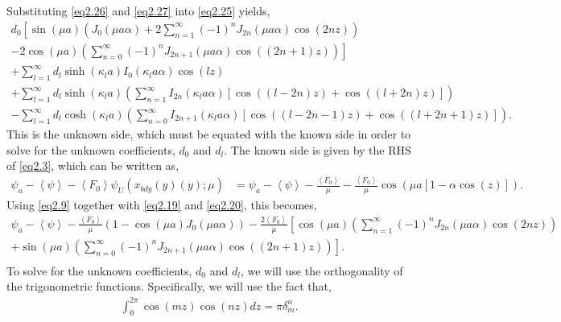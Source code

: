 \documentclass[aip,graphicx]{revtex4-1}
\newcommand{\lr}[1]{\left(#1\right)}
\newcommand{\lrsq}[1]{\left[ #1 \right]}
\newcommand{\lra}[1]{\left\langle #1 \right\rangle}
\newcommand{\xbdy}{x_{bdy}(y)}
\newcommand{\besj}[2]{J_{#1}\lr{#2}}
\newcommand{\besi}[2]{I_{#1}\lr{#2}}
\begin{document}
Substituting \eqref{eq2.26} and \eqref{eq2.27} into \eqref{eq2.25} yields,
         \begin{multline}
        d_0\left[\sin\lr{\mu a}\lr{\besj{0}{\mu a \alpha}+2\sum_{n=1}^{\infty}\lr{-1}^n\besj{2n}{\mu a \alpha}\cos\lr{2nz}}\right.\\
        \left.-2\cos\lr{\mu a}\lr{\sum_{n=0}^{\infty}\lr{-1}^n\besj{2n+1}{\mu a \alpha}\cos\lr{\lr{2n+1}z}}\right]\\
        +\sum_{l=1}^{\infty}d_l\sinh\lr{\kappa_l a}\besi{0}{\kappa_l a \alpha}\cos\lr{lz}\\
        +\sum_{l=1}^{\infty}d_l\sinh\lr{\kappa_l a}\lr{  
        \sum_{n=1}^{\infty}\besi{2n}{\kappa_l a \alpha}\lrsq{\cos\lr{\lr{l-2n}z}+\cos\lr{\lr{l+2n}z}}}\\
        -\sum_{l=1}^{\infty}d_l\cosh\lr{\kappa_l a}\lr{\sum_{n=0}^{\infty}\besi{2n+1}{\kappa_l a \alpha}\lrsq{\cos\lr{\lr{l-2n-1}z}+\cos\lr{\lr{l+2n+1}z}}}.\label{eq2.28}
        \end{multline}
This is the unknown side, which must be equated with the known side in order to solve for the unknown coefficients, $d_0$ and $d_l$.
The known side is given by the RHS of \eqref{eq2.3}, which can be written as,
        \begin{align}
            \psi_a-\lra{\psi}-\lra{F_0}\psi_U\lr{\xbdy(y);\mu}&=\psi_a-\lra{\psi}-\frac{\lra{F_0}}{\mu}-\frac{\lra{F_0}}{\mu}\cos\lr{\mu a\lrsq{1-\alpha\cos\lr{z}}}.\label{eq2.29}
        \end{align}
Using \eqref{eq2.9} together with \eqref{eq2.19} and \eqref{eq2.20}, this becomes,
        \begin{multline}
        \psi_a-\lra{\psi}-\frac{\lra{F_0}}{\mu}\lr{1-\cos\lr{\mu a}\besj{0}{\mu a \alpha}}-\frac{2\lra{F_0}}{\mu}\left[\cos\lr{\mu a}\lr{\sum_{n=1}^{\infty}\lr{-1}^n\besj{2n}{\mu a \alpha}\cos\lr{2nz}}\right.\\
        \left.+\sin\lr{\mu a}\lr{\sum_{n=0}^{\infty}\lr{-1}^n\besj{2n+1}{\mu a \alpha}\cos\lr{\lr{2n+1}z}}\right].\label{eq2.30}\\    
        \end{multline}
To solve for the unknown coefficients, $d_0$ and $d_l$, we will use the orthogonality of the trigonometric functions. Specifically, we will use the fact that,
    \begin{align}
        \int_0^{2\pi}\cos\lr{m z}\cos\lr{n z}dz = \pi\delta_{m}^{n}.\label{eq2.31}
    \end{align}
\end{document}
